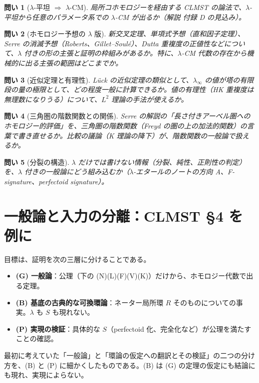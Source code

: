 \documentclass[11pt,a4paper]{ltjsarticle}
\theoremstyle{plain}
\newtheorem{question}{問い}
\theoremstyle{definition}
\theoremstyle{remark}
\theoremstyle{plain}
\begin{document}
\begin{question}[$\lambda$-平坦 $\Rightarrow$ $\lambda$-CM]
局所コホモロジーを経由する CLMST の論法で、$\lambda$-平坦から任意のパラメータ系での $\lambda$-CM が出るか（解説 付録 D の見込み）。
\end{question}

\begin{question}[ホモロジー予想の $\lambda$ 版]
新交叉定理、単項式予想（直和因子定理）、Serre の消滅予想（Roberts、Gillet--Soulé）、Dutta 重複度の正値性などについて、$\lambda$ 付きの形の主張と証明の枠組みがあるか。特に、$\lambda$-CM 代数の存在から機械的に出る主張の範囲はどこまでか。
\end{question}

\begin{question}[近似定理と有理性]
Lück の近似定理の類似として、$\lambda_\infty$ の値が塔の有限段の量の極限として、どの程度一般に計算できるか。値の有理性（HK 重複度は無理数になりうる）について、$L^2$ 理論の手法が使えるか。
\end{question}

\begin{question}[三角圏の階数関数との関係]
Serre の解説の「長さ付きアーベル圏へのホモロジー的評価」を、三角圏の階数関数（Freyd の圏の上の加法的関数）の言葉で書き直せるか。比較の議論（K 理論の降下）が、階数関数の一般論で扱えるか。
\end{question}

\begin{question}[分裂の構造]
$\lambda$ だけでは書けない情報（分裂、純性、正則性の判定）を、$\lambda$ 付きの一般論にどう組み込むか（$\lambda$-エタールのノートの方向 A、F-signature、perfectoid signature）。
\end{question}

\section{一般論と入力の分離：CLMST \S 4 を例に}\label{sec:separation}

目標は、証明を次の三層に分けることである。
\begin{itemize}
  \item \textbf{(G) 一般論}：公理（下の (N)(L)(F)(V)(K)）だけから、ホモロジー代数で出る定理。
  \item \textbf{(B) 基底の古典的な可換環論}：ネーター局所環 $R$ そのものについての事実。$\lambda$ も $S$ も現れない。
  \item \textbf{(P) 実現の検証}：具体的な $S$（perfectoid 化、完全化など）が公理を満たすことの確認。
\end{itemize}
最初に考えていた「一般論」と「環論の仮定への翻訳とその検証」の二つの分け方を、(B) と (P) に細かくしたものである。(B) は (G) の定理の仮定にも結論にも現れ、実現によらない。
\end{document}
